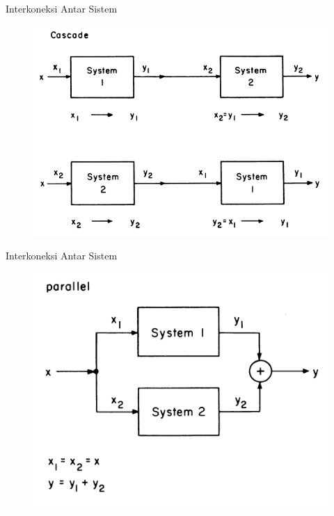 \documentclass[pdflatex,compress,mathserif]{beamer}
\begin{document}
\begin{frame}{Interkoneksi Antar Sistem}
	\begin{figure}
		\centering
		\includegraphics[height=0.8\textheight]{img/02.slide_10}
	\end{figure}
\end{frame}

\begin{frame}{Interkoneksi Antar Sistem}
	\begin{figure}
		\centering
		\includegraphics[height=0.8\textheight]{img/02.slide_11}
	\end{figure}
\end{frame}
\end{document}
